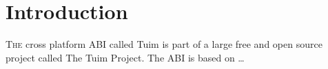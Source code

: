 \section{Introduction}

\lettrine{T}{he} cross platform ABI called Tuim\cite{std_abi}
is part of a large free and open source project called
The Tuim Project.
The ABI is based on \dots{}
